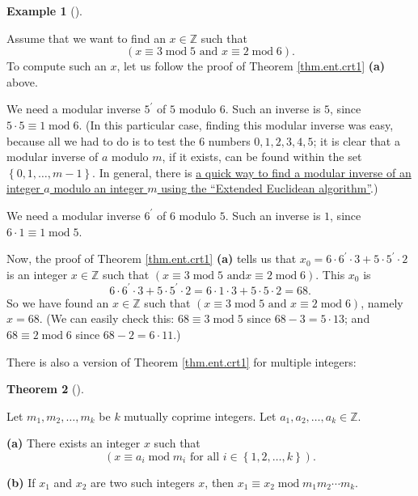 \documentclass[numbers=enddot,12pt,final,onecolumn,notitlepage]{scrartcl}%
\numberwithin{exer}{subsection}
\theoremstyle{definition}
\newtheorem{theo}{Theorem}[subsection]
\newenvironment{theorem}[1][]
{\begin{theo}[#1]\begin{leftbar}}
{\end{leftbar}\end{theo}}
\newtheorem{exam}[theo]{Example}
\newenvironment{example}[1][]
{\begin{exam}[#1]\begin{leftbar}}
{\end{leftbar}\end{exam}}
\begin{document}
\begin{example}
Assume that we want to find an $x\in\mathbb{Z}$ such that%
\[
\left(  x\equiv3\operatorname{mod}5\text{ and }x\equiv2\operatorname{mod}%
6\right)  .
\]
To compute such an $x$, let us follow the proof of Theorem \ref{thm.ent.crt1}
\textbf{(a)} above.

We need a modular inverse $5^{\prime}$ of $5$ modulo $6$. Such an inverse is
$5$, since $5\cdot5\equiv1\operatorname{mod}6$. (In this particular case,
finding this modular inverse was easy, because all we had to do is to test the
$6$ numbers $0,1,2,3,4,5$; it is clear that a modular inverse of $a$ modulo
$m$, if it exists, can be found within the set $\left\{  0,1,\ldots
,m-1\right\}  $. In general, there is
\href{https://en.wikipedia.org/wiki/Modular_multiplicative_inverse#Computation}{a
quick way to find a modular inverse of an integer $a$ modulo an integer $m$
using the \textquotedblleft Extended Euclidean algorithm\textquotedblright}.)

We need a modular inverse $6^{\prime}$ of $6$ modulo $5$. Such an inverse is
$1$, since $6\cdot1\equiv1\operatorname{mod}5$.

Now, the proof of Theorem \ref{thm.ent.crt1} \textbf{(a)} tells us that
$x_{0}=6\cdot6^{\prime}\cdot3+5\cdot5^{\prime}\cdot2$ is an integer
$x\in\mathbb{Z}$ such that $\left(  x\equiv3\operatorname{mod}5\text{ and
}x\equiv2\operatorname{mod}6\right)  $. This $x_{0}$ is%
\[
6\cdot6^{\prime}\cdot3+5\cdot5^{\prime}\cdot2=6\cdot1\cdot3+5\cdot5\cdot2=68.
\]
So we have found an $x\in\mathbb{Z}$ such that $\left(  x\equiv
3\operatorname{mod}5\text{ and }x\equiv2\operatorname{mod}6\right)  $, namely
$x=68$. (We can easily check this: $68\equiv3\operatorname{mod}5$ since
$68-3=5\cdot13$; and $68\equiv2\operatorname{mod}6$ since $68-2=6\cdot11$.)
\end{example}

There is also a version of Theorem \ref{thm.ent.crt1} for multiple integers:

\begin{theorem}
\label{thm.ent.crt1k}Let $m_{1},m_{2},\ldots,m_{k}$ be $k$ mutually coprime
integers. Let $a_{1},a_{2},\ldots,a_{k}\in\mathbb{Z}$.

\textbf{(a)} There exists an integer $x$ such that
\[
\left(  x\equiv a_{i}\operatorname{mod}m_{i}\text{ for all }i\in\left\{
1,2,\ldots,k\right\}  \right)  .
\]


\textbf{(b)} If $x_{1}$ and $x_{2}$ are two such integers $x$, then
$x_{1}\equiv x_{2}\operatorname{mod}m_{1}m_{2}\cdots m_{k}$.
\end{theorem}
\end{document}
